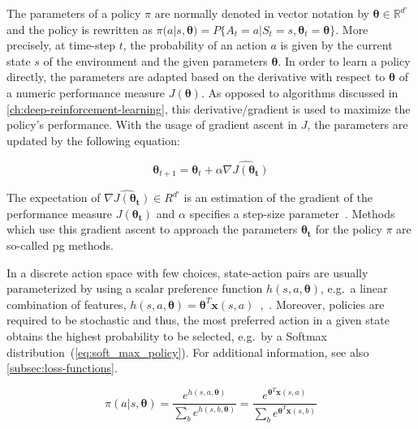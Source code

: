 \documentclass[draft,final]{vutinfth} %
\newcommand{\pautoref}[1]{(\autoref{#1})}
\newcommand{\p}[1]{see p. #1}
\begin{document}
    The parameters of a policy $\pi$ are normally denoted in vector notation by $\boldsymbol{\theta} \in \mathbb{R}^{d'}$ and the policy is rewritten as $\pi(a|s,\boldsymbol{\theta})=P\{A_t=a|S_t=s,\boldsymbol{\theta}_t=\boldsymbol{\theta}\}$.
    More precisely, at time-step $t$, the probability of an action $a$ is given by the current state $s$ of the environment and the given parameters $\boldsymbol{\theta}$.
    In order to learn a policy directly, the parameters are adapted based on the derivative with respect to $\boldsymbol{\theta}$ of a numeric performance measure $J(\boldsymbol{\theta})$.
    As opposed to algorithms discussed in \autoref{ch:deep-reinforcement-learning}, this derivative/gradient is used to maximize the policy's performance.
    With the usage of gradient ascent in $J$, the parameters are updated by the following equation:

    \begin{equation}
        \boldsymbol{\theta}_{t+1}=\boldsymbol{\theta}_{t} + \alpha \widehat{\nabla J(\boldsymbol{\theta_t})}\label{eq:parameter_update}
    \end{equation}

    The expectation of $\widehat{\nabla J(\boldsymbol{\theta_t})} \in R^{d'}$ is an estimation of the gradient of the performance measure $J(\boldsymbol{\theta_t})$ and $\alpha$ specifies a step-size parameter~.
    Methods which use this gradient ascent to approach the parameters $\boldsymbol{\theta_t}$ for the policy $\pi$ are so-called \gls{pg} methods.

    In a discrete action space with few choices, state-action pairs are usually parameterized by using a scalar preference function $h(s,a,\boldsymbol{\theta})$, e.g.\ a linear combination of features, $h(s,a,\boldsymbol{\theta})=\boldsymbol{\theta}^T\boldsymbol{x}(s,a)$~\citep[\p{321}]{sutton_reinforcement_2018},~.
    Moreover, policies are required to be stochastic and thus, the most preferred action in a given state obtains the highest probability to be selected, e.g.\ by a Softmax distribution~\pautoref{eq:soft_max_policy}.
    For additional information, see also \autoref{subsec:loss-functions}.

    \begin{equation}
        \pi(a|s,\boldsymbol{\theta})=\frac{e^{h(s,a,\boldsymbol{\theta})}}{\sum_{b}e^{h(s,b,\boldsymbol{\theta})}}=\frac{e^{\boldsymbol{\theta}^T\boldsymbol{x}(s,a)}}{\sum_{b}e^{\boldsymbol{\theta}^T\boldsymbol{x}(s,b)}}\label{eq:soft_max_policy}
    \end{equation}
\end{document}
